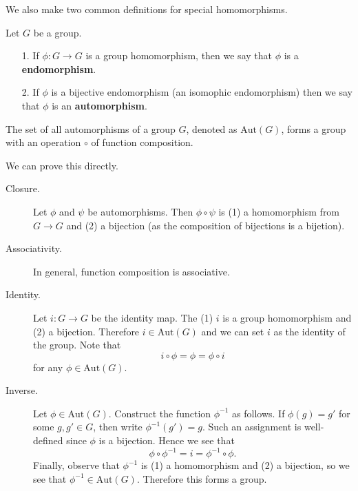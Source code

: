     We also make two common definitions for special homomorphisms. 
    \begin{definition}
        Let $G$ be a group.
        \begin{itemize}
            \item[1.] If $\phi: G \to G$ is a group homomorphism, then
            we say that $\phi$ is a \textbf{endomorphism}.
            \item[2.] If $\phi$ is a bijective endomorphism (an
            isomophic endomorphism) then we say that $\phi$ is an \textbf{automorphism}.
        \end{itemize} 
    \end{definition}

    \begin{thm}
        The set of all automorphisms of a group $G$, denoted as
        $\text{Aut}(G)$, forms a group with an operation $\circ$ of
        function composition.
    \end{thm}

    \begin{prf}
        We can prove this directly. 
        \begin{description}
            \item[Closure.] Let $\phi$ and $\psi$ be automorphisms.
            Then $\phi \circ \psi$ is (1) a homomorphism from $G \to
            G$ and (2) a bijection (as the composition of bijections
            is a bijetion).

            \item[Associativity.] In general, function composition is
            associative. 

            \item[Identity.] Let $i:G \to G$ be the identity map. The
            (1) $i$ is a group homomorphism and (2) a bijection.
            Therefore $i \in \text{Aut}(G)$ and we can set $i$ as the
            identity of the group. Note that 
            \[
                i \circ \phi = \phi = \phi \circ i   
            \]
            for any $\phi \in \text{Aut}(G)$. 

            \item[Inverse.] Let $\phi \in \text{Aut}(G)$. Construct
            the function $\phi^{-1}$ as follows. If $\phi(g) = g'$ for
            some $g, g' \in G$, then write $\phi^{-1}(g') = g$. Such
            an assignment is well-defined since  $\phi$ is a
            bijection. Hence we see that 
            \[
                \phi \circ \phi^{-1} = i = \phi^{-1} \circ \phi.
            \]
            Finally, observe that $\phi^{-1}$ is (1) a homomorphism
            and (2) a bijection, so we see that $\phi^{-1} \in
            \text{Aut}(G)$. Therefore this forms a group.
        \end{description}
    \end{prf}



